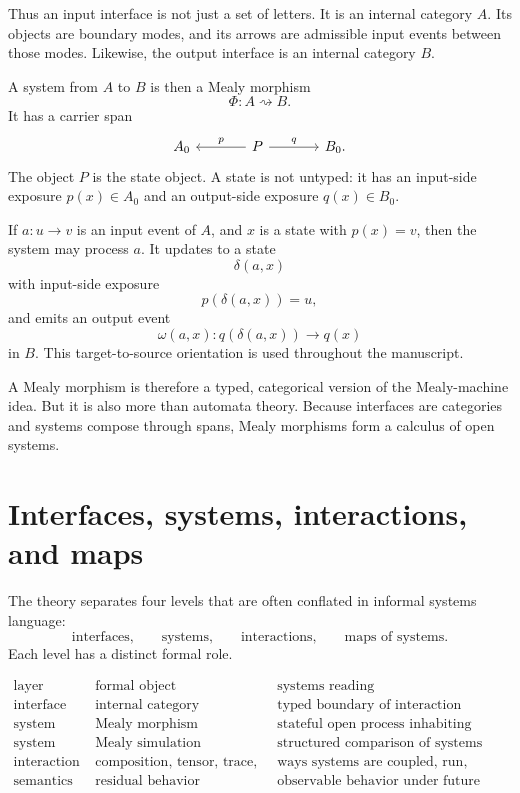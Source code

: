Thus an input interface is not just a set of letters.  It is an internal
category \(A\).  Its objects are boundary modes, and its arrows are admissible
input events between those modes.  Likewise, the output interface is an
internal category \(B\).

A system from \(A\) to \(B\) is then a Mealy morphism
\[
  \Phi:A\rightsquigarrow B.
\]
It has a carrier span
\[
\begin{tikzcd}[column sep=large]
  A_0
  &
  P
    \ar[l,"p"']
    \ar[r,"q"]
  &
  B_0 .
\end{tikzcd}
\]
The object \(P\) is the state object.  A state is not untyped: it has an
input-side exposure \(p(x)\in A_0\) and an output-side exposure
\(q(x)\in B_0\).

If \(a:u\to v\) is an input event of \(A\), and \(x\) is a state with
\(p(x)=v\), then the system may process \(a\).  It updates to a state
\[
  \delta(a,x)
\]
with input-side exposure
\[
  p(\delta(a,x))=u,
\]
and emits an output event
\[
  \omega(a,x):q(\delta(a,x))\to q(x)
\]
in \(B\).  This target-to-source orientation is used throughout the
manuscript.

A Mealy morphism is therefore a typed, categorical version of the
Mealy-machine idea.  But it is also more than automata theory.  Because
interfaces are categories and systems compose through spans, Mealy morphisms
form a calculus of open systems.

\section{Interfaces, systems, interactions, and maps}
\label{sec:interfaces-systems-interactions-maps}

The theory separates four levels that are often conflated in informal systems
language:
\[
  \text{interfaces,}
  \qquad
  \text{systems,}
  \qquad
  \text{interactions,}
  \qquad
  \text{maps of systems.}
\]
Each level has a distinct formal role.

\[
\begin{array}{c|c|c}
\text{layer}
&
\text{formal object}
&
\text{systems reading}
\\
\hline
\text{interface}
&
\text{internal category}
&
\text{typed boundary of interaction}
\\
\text{system}
&
\text{Mealy morphism}
&
\text{stateful open process inhabiting interfaces}
\\
\text{system map}
&
\text{Mealy simulation}
&
\text{structured comparison of systems}
\\
\text{interaction}
&
\text{composition, tensor, trace, execution}
&
\text{ways systems are coupled, run, hidden, or composed}
\\
\text{semantics}
&
\text{residual behavior}
&
\text{observable behavior under future interaction}
\end{array}
\]

